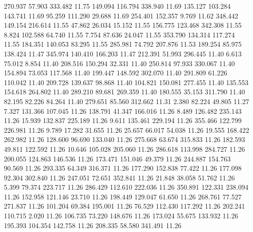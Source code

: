  270.937   57.903  333.482        11.75
 149.094  116.794  338.940        11.69
 135.127  103.284  143.741        11.69
  95.259  111.290   29.688        11.69
 254.401  152.357    9.769        11.62
 348.442  149.154  216.614        11.55
  47.862   26.034   15.152        11.55
 156.775  123.468  342.308        11.55
   8.824  102.588   64.740        11.55
   7.754   87.636   24.047        11.55
 353.790  134.314  117.274        11.55
 184.351  140.053   83.295        11.55
 285.981   74.792  207.876        11.53
 189.254   85.975  138.424        11.47
 345.974  140.410  166.203        11.47
 212.391   51.993  296.445        11.40
   6.613   75.012    8.854        11.40
 208.516  150.294   32.331        11.40
 250.814   97.933  330.067        11.40
 154.894   73.053  117.568        11.40
 199.447  148.592  302.070        11.40
 291.809   61.226  110.042        11.40
 209.728  139.637   98.868        11.40
 104.821  150.081  277.455        11.40
 135.553  154.618  264.802        11.40
 289.210   89.681  269.359        11.40
 180.555   35.153  311.790        11.40
  82.195   82.226   84.264        11.40
 279.651   85.560  312.662        11.31
   2.380   82.224   49.805        11.27
   7.327  131.366  107.045        11.26
 138.791   41.347  166.016        11.26
   8.489  126.482  235.143        11.26
  15.939  132.837  225.189        11.26
   9.611  135.461  229.194        11.26
 355.466  122.799  226.981        11.26
   9.789   17.282   31.655        11.26
  25.657   66.017   54.038        11.26
  19.555  168.422  262.982        11.26
 128.600   96.690  133.040        11.26
 275.668   63.674  315.833        11.26
 182.593   49.811  122.592        11.26
  10.646  105.028  205.060        11.26
 286.618  113.998  284.727        11.26
 200.055  124.863  146.536        11.26
 173.471  151.046   49.379        11.26
 244.887  154.763   90.569        11.26
 293.335   64.349  316.371        11.26
 177.290  152.838   77.422        11.26
 177.098   92.304  302.840        11.26
 247.051   72.651  352.841        11.26
  21.848   38.058   51.762        11.26
   5.399   79.374  223.717        11.26
 286.429  112.610  222.036        11.26
 350.891  122.331  238.094        11.26
 152.958  121.146   23.710        11.26
 198.449  129.047   61.650        11.26
 268.761   77.527  271.837        11.26
 101.204   69.384  195.001        11.26
  76.529  112.430  117.292        11.26
 202.241  110.715    2.020        11.26
 106.735   73.220  148.676        11.26
 173.024   55.675  133.932        11.26
 195.393  104.354  142.758        11.26
 208.335   58.580  341.491        11.26
